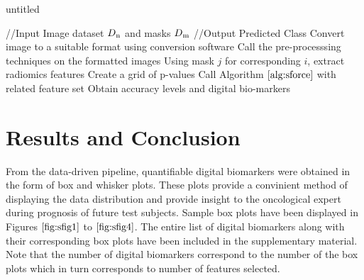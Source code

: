 \documentclass[10pt,journal,compsoc]{IEEEtran}
\begin{document}
\begin{algorithm}[!t]
\caption{untitled}\label{main}
\begin{algorithmic}[1]
\footnotesize
\STATE //Input Image dataset $D\textsubscript{n}$ and masks $D\textsubscript{m}$ 
\STATE //Output Predicted Class
\STATE Convert image to a suitable format using conversion software
\STATE Call the pre-processsing techniques on the formatted images
\STATE Using mask $j$ for corresponding $i$, extract radiomics features
\STATE Create a grid of p-values
\STATE Call Algorithm $\ref{alg:sforce}$ with related feature set
\ENDFOR
\STATE Obtain accuracy levels and digital bio-markers
\ENDFOR
\end{algorithmic}
\end{algorithm}

\section{Results and Conclusion}

From the data-driven pipeline, quantifiable digital biomarkers were obtained in the form of box and whisker plots. These plots provide a convinient method of displaying the data distribution and provide insight to the oncological expert during prognosis of future test subjects. Sample box plots have been displayed in Figures $\ref{fig:sfig1}$ to $\ref{fig:sfig4}$. The entire list of digital biomarkers along with their corresponding box plots have been included in the supplementary material. Note that the number of digital biomarkers correspond to the number of the box plots which in turn corresponds to number of features selected. 
\end{document}
